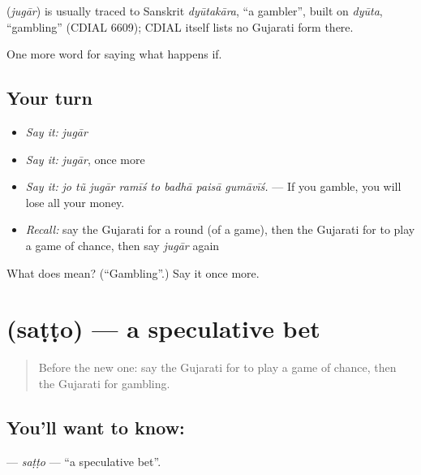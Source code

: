 \begin{cousinweb}
\textbf{} (\emph{jugār}) is usually traced to Sanskrit \emph{dyūtakāra}, \textquotedblleft{}a gambler\textquotedblright{}, built on \emph{dyūta}, \textquotedblleft{}gambling\textquotedblright{} (CDIAL 6609); CDIAL itself lists no Gujarati form there.
\end{cousinweb}

\begin{grammarlens}[title={What you've built}]
One more word for saying what happens if.
\end{grammarlens}

\subsection*{Your turn}
\begin{itemize}
\raggedright
  \item \emph{Say it:} \emph{jugār}
  \item \emph{Say it:} \emph{jugār}, once more
  \item \emph{Say it:} \emph{jo tũ jugār ramīś to badhā paisā gumāvīś.} — If you gamble, you will lose all your money.
  \item \emph{Recall:} say the Gujarati for a round (of a game), then the Gujarati for to play a game of chance, then say \emph{jugār} again
\end{itemize}

\begin{tcolorbox}[breakable,colback=teal!4,colframe=teal!35!black,title={Before you move on}]
What does  mean? (\textquotedblleft{}Gambling\textquotedblright{}.) Say it once more.
\end{tcolorbox}
\section[\texorpdfstring{\gu{સટ્ટો} (saṭṭo)}{સટ્ટો (saṭṭo)}]{ (saṭṭo) — a speculative bet}

\label{lesson:GU-C534-satto}



\begin{quote}
Before the new one: say the Gujarati for to play a game of chance, then the Gujarati for gambling.
\end{quote}

\subsection*{You'll want to know: }
\textbf{} — \emph{saṭṭo} — \textquotedblleft{}a speculative bet\textquotedblright{}.

